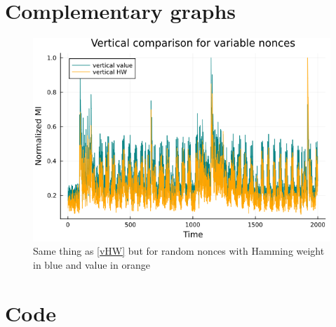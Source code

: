 \documentclass[11pt,technote]{IEEEtran}
\begin{document}
		\section{Complementary graphs}
		\begin{figure}[h]
			\centering
			\includegraphics[scale=0.3]{img_files/vertical_one_byte}
			\caption{Same thing as \ref{vHW} but for random nonces with Hamming weight in blue and value in orange}
			\label{vHW&val}
		\end{figure}
		
		\section{Code} 
		
		
		
		
		
		
		
		
		
		
		
		

	
\end{document}
